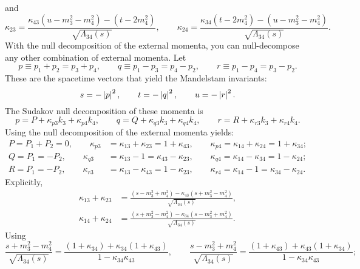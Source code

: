 and
\begin{equation}
	\kappa_{23} = \frac{\kappa_{43} \left( u - m_{3}^{2} - m_{4}^{2} \right) - \left( t - 2 m_{4}^{2} \right) }{\sqrt{\Lambda_{34}(s)}}, \qquad
	\kappa_{24} = \frac{\kappa_{34} \left( t - 2 m_{4}^{2} \right) - \left( u - m_{3}^{2} - m_{4}^{2} \right) }{\sqrt{\Lambda_{34}(s)}}.
\end{equation}
With the null decomposition of the external momenta, you can null-decompose any other combination of external momenta. Let
\begin{equation}
	p \equiv p_{1} + p_{2} = p_{3} + p_{4}, \qquad q \equiv p_{1} - p_{3} = p_{4} - p_{2}, \qquad r \equiv p_{1} - p_{4} = p_{3} - p_{2}.
\end{equation}
These are the spacetime vectors that yield the Mandelstam invariants:
\begin{equation}
	s = -\left\lvert p \right\rvert^{2}, \qquad t = -\left\lvert q \right\rvert^{2}, \qquad u = -\left\lvert r \right\rvert^{2}.
\end{equation}
The Sudakov null decomposition of these momenta is
\begin{equation}
	p = P + \kappa_{p3} k_{3} + \kappa_{p4} k_{4}, \qquad q = Q + \kappa_{q3} k_{3} + \kappa_{q4} k_{4}, \qquad r = R + \kappa_{r3} k_{3} + \kappa_{r4} k_{4}.
\end{equation}
Using the null decomposition of the external momenta yields:
\begin{align}
	P = P_{1} + P_{2} = 0, \qquad \kappa_{p3} &= \kappa_{13} + \kappa_{23} = 1 + \kappa_{43}, \qquad \kappa_{p4} = \kappa_{14} + \kappa_{24} = 1 + \kappa_{34}; \\
	Q = P_{1} = -P_{2}, \qquad \kappa_{q3} &= \kappa_{13} - 1 = \kappa_{43} - \kappa_{23}, \qquad \kappa_{q4} = \kappa_{14} - \kappa_{34} = 1 - \kappa_{24}; \\
	R = P_{1} = -P_{2}, \qquad \kappa_{r3} &= \kappa_{13} - \kappa_{43} = 1 - \kappa_{23}, \qquad \kappa_{r4} = \kappa_{14} - 1 = \kappa_{34} - \kappa_{24}.
\end{align}
Explicitly,
\begin{align}
	\kappa_{13} + \kappa_{23} &= \frac{ \left(s - m_{3}^{2} + m_{4}^{2}\right) - \kappa_{43} \left(s + m_{3}^{2} - m_{4}^{2} \right) }{\sqrt{\Lambda_{34}(s)}}, \\
	\kappa_{14} + \kappa_{24} &= \frac{ \left(s + m_{3}^{2} - m_{4}^{2}\right) - \kappa_{34} \left(s - m_{3}^{2} + m_{4}^{2} \right) }{\sqrt{\Lambda_{34}(s)}}.
\end{align}
Using
\begin{equation}
	\frac{s + m_{3}^{2} - m_{4}^{2}}{\sqrt{\Lambda_{34}(s)}} = \frac{\left( 1 + \kappa_{34} \right) + \kappa_{34} \left( 1 + \kappa_{43} \right)}{1 - \kappa_{34} \kappa_{43}}, \qquad \frac{s - m_{3}^{2} + m_{4}^{2}}{\sqrt{\Lambda_{34}(s)}} = \frac{\left( 1 + \kappa_{43} \right) + \kappa_{43} \left( 1 + \kappa_{34} \right)}{1 - \kappa_{34} \kappa_{43}};
\end{equation}
